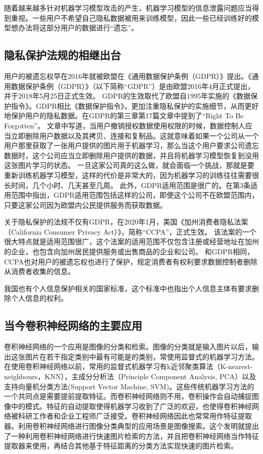 随着越来越多针对机器学习模型攻击的产生，机器学习模型的信息泄露问题应当得到重视。一些用户不希望自己隐私数据被用来训练模型，因此一些已经训练好的模型想办法将这部分用户的数据进行“遗忘”。
\subsection{隐私保护法规的相继出台}
用户的被遗忘权早在2016年就被欧盟在《通用数据保护条例（GDPR）》提出。《通用数据保护条例（GDPR）》\cite{gdpr2018}（以下简称“GDPR”）是由欧盟2016年4月正式提出，并于2018年5月25日正式生效。
GDPR的生效取代了欧盟自1995年实施的《数据保护指令》。GDPR相比《数据保护指令》，更加注重隐私保护的实施细节，从而更好地保护用户的隐私数据。在GDPR的第三章第17篇文章中提到了“Right To Be Forgotten”。
文章中写道，当用户撤销授权数据使用权限的时候，数据控制人应当立即删除用户数据以及其拷贝、连接和复制品。这就意味着如果一个公司从一个用户那里获取了一张用户提供的图片用于机器学习，那么当这个用户要求公司遗忘数据时，这个公司应当立即删除用户提供的数据，并且将机器学习模型恢复到没用这张图片学习的状态。
一旦这家公司真的这么做，就会面临一个挑战，那就是要重新训练机器学习模型，这样的代价是非常大的，因为机器学习的训练往往需要很长时间，几个小时、几天甚至几周。
此外，GDPR适用范围是很广的。在第3条适用范围中指出，GDPR适用范围包括这样的公司，即使这个公司不在欧盟范围内，只要这家公司因为欧盟内公民提供服务而获取数据。

关于隐私保护的法规不仅有GDPR，在2020年1月，美国《加州消费者隐私法案（California Consumer Privacy Act）》\cite{ccpa2020}，简称“CCPA”，正式生效。
该法案的一个很大特点就是适用范围很广，这个法案的适用范围不仅包含注册或经营地址在加州的企业，也包含向加州居民提供服务或出售商品的企业和公司\cite{jiahui2020}。
和GDPR相同，CCPA也对用户的被遗忘权也进行了保护，规定消费者有权利要求数据控制者删除从消费者收集的信息。

我国也有个人信息保护相关的国家标准\cite{gbt35273}，这个标准中也指出个人信息主体有要求删除个人信息的权利。

\subsection{当今卷积神经网络的主要应用}
卷积神经网络的一个应用是图像的分类和检索。图像的分类就是输入图片以后，输出这张图片在若干指定类别中最有可能是的类别，常使用监督式的机器学习方法。在使用卷积神经网络以前，常用的监督式机器学习有k近邻聚类算法（K-nearest-neighbours，KNN），主成分分析法（Principle Component Analysis, PCA）以及支持向量机分类方法(Support Vector Machine, SVM)\cite{zhouzhihua2016}。这些传统机器学习方法的一个共同点是需要提前提取特征。而卷积神经网络则不用，卷积操作会自动捕捉图像中的模式。特征的自动提取使得机器学习收到了广泛的欢迎，也使得卷积神经网络被科研工作者和企业工程师广泛接受。卷积神经网络因此也常常用作特征提取器。利用卷积神经网络进行图像分类典型的应用场景是图像搜索。这个发明\cite{lingqiang2016}就提出了一种利用卷积神经网络进行快速图片检索的方法，并且把卷积神经网络当作特征提取器来使用，再结合其他基于特征距离的分类方法实现快速的图片检索。


